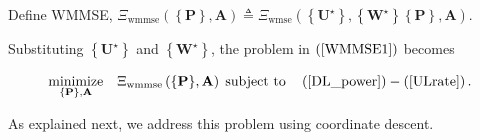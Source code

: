 \documentclass[9pt,journal]{IEEEtran}
\newcommand{\paren}[1]{\left({#1}\right)}
\newcommand{\bracket}[1]{{\left [{#1}\right ]}}
\newcommand{\braces}[1]{{\left\{ {#1}\right\}}}
\newcommand{\rr}{_\mathrm{r}}
\newcommand{\B}{\textrm{B}}
\newcommand{\WBj}{\mathbf{W}_{\mathrm{d},j}\bracket{k}}
\theoremstyle{definition}
\begin{document}
Define WMMSE, $\Xi_{\textrm{wmmse}}\paren{\braces{\mathbf{P}},\mathbf{A}}\triangleq\Xi_{\textrm{wmse}}\paren{\braces{\mathbf{U}^\star}, \braces{\mathbf{W}^\star} \braces{\mathbf{P}},\mathbf{A}}$. %

Substituting $\braces{\mathbf{U}^\star}$ and $\braces{\mathbf{W}^\star}$, the problem in $\paren{\ref{WMMSE1}}$ becomes\par\noindent\small
\begin{equation}
\label{WMMSE2}
\underset{{\braces{\mathbf{P}},\mathbf{A}}}{\textrm{minimize}}\quad\Xi_{\textrm{wmmse}}\paren{\braces{\mathbf{P}},\mathbf{A}}\;\textrm{subject to}\quad  \paren{\mathrm{\ref{DL_power}}}-\paren{\mathrm{\ref{ULrate}}}.
\end{equation}\normalsize

As explained next, we address this problem using coordinate descent.
\vspace{-1em}
\end{document}
